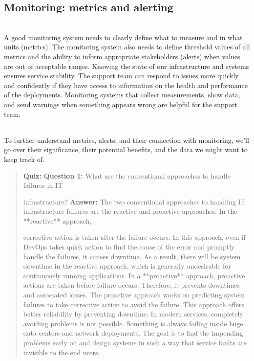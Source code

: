 

\subsection{Monitoring: metrics and alerting}\label{HNXxNorp7ygmFhvlS9k23}
\\
A good monitoring system needs to clearly define what to measure and in what units (metrics). The monitoring system also needs to define threshold values of all metrics and the ability to inform appropriate stakeholders (alerts) when values are out of acceptable ranges. Knowing the state of our infrastructure and systems ensures service stability. The support team can respond to issues more quickly and confidently if they have access to information on the health and performance of the deployments. Monitoring systems that collect measurements, show data, and send warnings when something appears wrong are helpful for the support team.\\
\strut \\
To further understand metrics, alerts, and their connection with monitoring, we'll go over their significance, their potential benefits, and the data we might want to keep track of.

\begin{quote}
\textbf{Quiz:}
\textbf{Question 1:} What are the conventional approaches to handle failures in IT

infrastructure?
\textbf{Answer:} The two conventional approaches to handling IT infrastructure failures are the reactive and proactive approaches. In the **reactive** approach,

corrective action is taken after the failure occurs. In this approach, even if DevOps takes quick action to find the cause of the error and promptly handle the failures, it causes downtime. As a result, there will be system downtime in the reactive approach, which is generally undesirable for continuously running applications. In a **proactive**
approach, proactive actions are taken before failure occurs. Therefore, it prevents downtimes and associated losses. The proactive approach works on predicting system failures to take corrective action to avoid the failure. This approach offers better reliability by preventing downtime. In modern services, completely avoiding problems is not possible. Something is always failing inside huge data centers and network deployments. The goal is to find the impending problems early on and design systems in such a way that service faults are invisible to the end users.
\end{quote}

